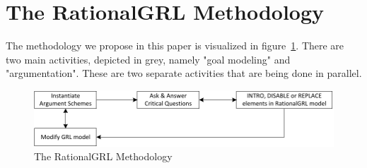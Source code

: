 \section{The RationalGRL Methodology}
\label{sect:methodology}

The methodology we propose in this paper is visualized in figure~\ref{fig:rationalgrl-methodology}. There are two main activities, depicted in grey, namely "goal modeling" and "argumentation". These are two separate activities that are being done in parallel. 

\begin{figure}[ht]
\centering
\includegraphics[scale=0.4]{img/methodology}
\caption{The RationalGRL Methodology}
\label{fig:rationalgrl-methodology}
\end{figure}